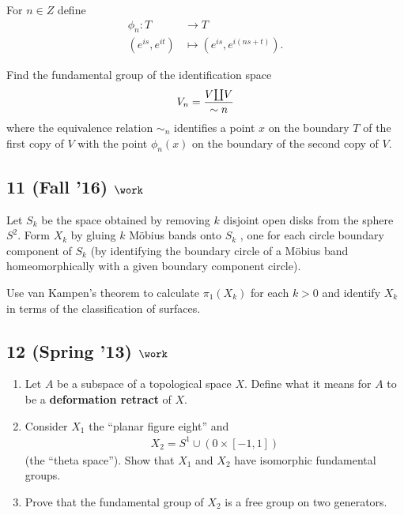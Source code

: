 For \(n \in Z\) define
\begin{align*} \phi_n : T &\to T \\ (e^{is} , e^{it} ) &\mapsto (e^{is} , e^{i(ns+t)}) .\end{align*}

Find the fundamental group of the identification space
\begin{align*}
V_n = {V{\coprod}V \over \sim n}
\end{align*}
where the equivalence relation \(\sim_n\) identifies a point \(x\) on
the boundary \(T\) of the first copy of \(V\) with the point
\(\phi_n (x)\) on the boundary of the second copy of \(V\).

\hypertarget{fall-16-work-3}{%
\subsection{\texorpdfstring{11 (Fall '16)
\(\work\)}{11 (Fall '16) \textbackslash work}}\label{fall-16-work-3}}

Let \(S_k\) be the space obtained by removing \(k\) disjoint open disks
from the sphere \(S^2\). Form \(X_k\) by gluing \(k\) Möbius bands onto
\(S_k\) , one for each circle boundary component of \(S_k\) (by
identifying the boundary circle of a Möbius band homeomorphically with a
given boundary component circle).

Use van Kampen's theorem to calculate \(\pi_1 (X_k)\) for each \(k > 0\)
and identify \(X_k\) in terms of the classification of surfaces.

\hypertarget{spring-13-work-2}{%
\subsection{\texorpdfstring{12 (Spring '13)
\(\work\)}{12 (Spring '13) \textbackslash work}}\label{spring-13-work-2}}

\begin{enumerate}
\def\labelenumi{\alph{enumi}.}
\item
  Let \(A\) be a subspace of a topological space \(X\). Define what it
  means for \(A\) to be a \textbf{deformation retract} of \(X\).
\item
  Consider \(X_1\) the ``planar figure eight'' and
  \begin{align*}X_2 = S^1 \cup ({0} \times [-1, 1])\end{align*}
  (the ``theta space''). Show that \(X_1\) and \(X_2\) have isomorphic
  fundamental groups.
\item
  Prove that the fundamental group of \(X_2\) is a free group on two
  generators.
\end{enumerate}

